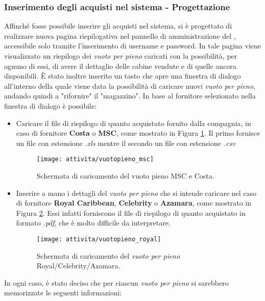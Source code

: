 \subsubsection{Inserimento degli acquisti nel sistema - Progettazione}
Affinché fosse possibile inserire gli acquisti nel sistema, si è progettato di realizzare nuova pagina riepilogativa nel pannello di amministrazione del \bookingEngine, accessibile solo tramite l'inserimento di username e password. In tale pagina viene visualizzato un riepilogo dei \textit{vuoto per pieno} caricati con la possibilità, per ognuno di essi, di avere il dettaglio delle cabine vendute e di quelle ancora disponibili. È stato inoltre inserito un tasto che apre una finestra di dialogo all'interno della quale viene data la possibilità di caricare nuovi \textit{vuoto per pieno}, andando quindi a "rifornire" il "magazzino". In base al fornitore selezionato nella finestra di dialogo è possibile: 
\begin{itemize}
	\item Caricare il file di riepilogo di quanto acquistato fornito dalla compagnia, in caso di fornitore \textbf{Costa} o \textbf{MSC}, come mostrato in Figura \ref{figura:upload-msc-costa}. Il primo fornisce un file con estensione \textit{.xls} mentre il secondo un file con estensione \textit{.csv}
	\begin{figure}[!h] 
		\centering 
		\texttt{[image: attivita/vuotopieno\_msc]} 
		\caption{Schermata di caricamento del vuoto pieno MSC e Costa.}
		\label{figura:upload-msc-costa}
	\end{figure}
	\item Inserire a mano i dettagli del \textit{vuoto per pieno} che si intende caricare nel caso di fornitore \textbf{Royal Caribbean}, \textbf{Celebrity} o \textbf{Azamara}, come mostrato in Figura \ref{figura:upload-royal}. Essi infatti forniscono il file di riepilogo di quanto acquistato in formato \textit{.pdf}, che è molto difficile da interpretare.
	\begin{figure}[!h] 
		\centering 
		\texttt{[image: attivita/vuotopieno\_royal]} 
		\caption{Schermata di caricamento del \textit{vuoto per pieno} Royal/Celebrity/Azamara.}
		\label{figura:upload-royal}
	\end{figure}
\end{itemize}
In ogni caso, è stato deciso che per ciascun \textit{vuoto per pieno} si sarebbero memorizzate le seguenti informazioni:
